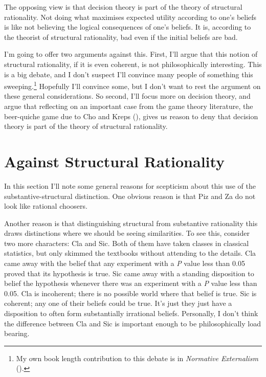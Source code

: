\documentclass[
  12pt,
  letterpaper,
  DIV=11,
  numbers=noendperiod]{scrreprt}
\begin{document}
The opposing view is that decision theory is part of the theory of
structural rationality. Not doing what maximises expected utility
according to one's beliefs is like not believing the logical
consequences of one's beliefs. It is, according to the theorist of
structural rationality, bad even if the initial beliefs are bad.

I'm going to offer two arguments against this. First, I'll argue that
this notion of structural rationality, if it is even coherent, is not
philosophically interesting. This is a big debate, and I don't suspect
I'll convince many people of something this sweeping.\footnote{My own
  book length contribution to this debate is in \emph{Normative
  Externalism} ().}
Hopefully I'll convince some, but I don't want to rest the argument on
these general considerations. So second, I'll focus more on decision
theory, and argue that reflecting on an important case from the game
theory literature, the beer-quiche game due to Cho and Kreps
(), gives us reason to deny that
decision theory is part of the theory of structural rationality.

\section{Against Structural Rationality}\label{sec-against-structural}

In this section I'll note some general reasons for scepticism about this
use of the substantive-structural distinction. One obvious reason is
that Piz and Za do not look like rational choosers.

Another reason is that distinguishing structural from substantive
rationality this draws distinctions where we should be seeing
similarities. To see this, consider two more characters: Cla and Sic.
Both of them have taken classes in classical statistics, but only
skimmed the textbooks without attending to the details. Cla came away
with the belief that any experiment with a \emph{P} value less than 0.05
proved that its hypothesis is true. Sic came away with a standing
disposition to belief the hypothesis whenever there was an experiment
with a \emph{P} value less than 0.05. Cla is incoherent; there is no
possible world where that belief is true. Sic is coherent; any one of
their beliefs could be true. It's just they just have a disposition to
often form substantially irrational beliefs. Personally, I don't think
the difference between Cla and Sic is important enough to be
philosophically load bearing.
\end{document}
